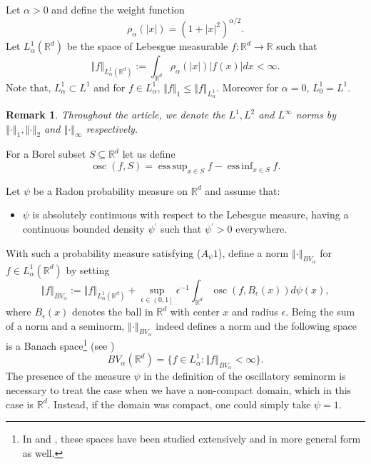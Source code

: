 \documentclass{amsart}
\newtheorem{remark}[theorem]{Remark}
\newcommand\bR{{\mathbb R}}
\newcommand{\norm}[1]{\left\Vert#1\right\Vert}
\DeclareMathOperator*{\esssup}{ess\, sup}
\DeclareMathOperator*{\essinf}{ess\, inf}
\begin{document}
Let $\alpha > 0 $ and define the weight function 
\begin{equation}  \label{WF}
\rho_{\alpha} \left( \left\vert x\right\vert \right) =\left( 1+\left\vert
x\right\vert ^{2}\right) ^{\alpha/2}.
\end{equation}
Let $L_{\alpha}^{1}\left( \mathbb{R}^{d}\right) $ be the space of Lebesgue
measurable $f:\mathbb{R}^{d}\rightarrow\mathbb{R}$ such that 
\begin{equation*}
\left\Vert f\right\Vert _{L_{\alpha}^{1}\left( \mathbb{R}^{d}\right)
}:=\int_{\mathbb{R}^{d}}\rho_{\alpha} \left( \left\vert x\right\vert \right)
\left\vert f\left( x\right) \right\vert dx<\infty. 
\end{equation*}
Note that, $L^1_{\alpha} \subset L^{1} $ and for $f \in L^1_{\alpha} $, $\norm{ f }_1 \leq \norm{ f }_{L^1_{\alpha}} $. Moreover for $\alpha= 0$, $L^1_0 = L^1$. 

\begin{remark}
    Throughout the article, we denote the \(L^1, L^2\) and \(L^\infty\) norms by \(\norm{\cdot}_1, \norm{\cdot}_2\) and \(\norm{\cdot}_\infty\) respectively.
\end{remark}

For a Borel subset $S\subseteq \mathbb{R}^{d}$ let us define 
 \begin{equation*}
 \operatorname{osc}(f,S)= \esssup_{x\in S}f -\essinf_{x\in S}f.
 \end{equation*}
 
 Let  $\psi$ be a Radon probability measure on $\mathbb{R}^d$ and assume that: 

\begin{itemize}
\item[\textbf{($A_{\protect\psi}1$)}] $\psi$ is absolutely continuous with respect to
the Lebesgue measure, having a continuous bounded density $\psi^{\prime }$
such that $\psi^{\prime }>0$ everywhere. 
\end{itemize}

With such a  probability measure satisfying (\(A_\psi 1\)), define a norm $\norm{ \cdot }_{BV_{\alpha}}$ for \(f\in L^1_\alpha(\bR^d)\)  by setting 
\begin{equation}  \label{def:BValpha}
\norm{ f}_{BV_{\alpha}}:=\norm{f}_{L_{\alpha
}^{1}\left( \mathbb{R}^{d}\right) }+\sup_{\epsilon\in\left( 0,1\right]
}\epsilon^{-1}\int_{\mathbb{R}^{d}}\operatorname{osc}\left( f,B_{\epsilon}\left( x\right)
\right) d\psi(x),
\end{equation}
where $B_{\epsilon }(x)$ denotes the ball in $\mathbb{R}^d$ with center $x$ and radius $\epsilon$.
Being the sum of a norm and a seminorm, $\norm{ \cdot }_{BV_{\alpha}}$ indeed defines a norm and the following space is a Banach space\footnote{In \cite{S2000} and \cite{K85}, these spaces have been studied extensively and in more general form as well.} (see \cite[Proposition~3.3]{S2000})
\[
BV_\alpha(\bR^d)=\{f\in L^1_\alpha: \norm{f}_{BV_\alpha}<\infty\}.
\] 
 The presence of the measure $\psi$ in the definition of the oscillatory seminorm is necessary to treat the case when we have a non-compact domain, which in this case is $\mathbb{R}^d$. Instead, if the domain was compact, one could simply take $\psi=1$.\\
\end{document}
